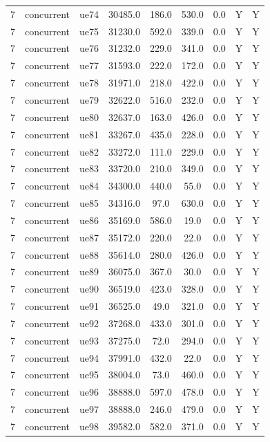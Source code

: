 \begin{table}[ht]
\begin{tabular}{|c|c|c|c|c|c|c|c|c|}
7 & concurrent & ue74 & 30485.0 & 186.0 & 530.0 & 0.0 & Y & Y \\
7 & concurrent & ue75 & 31230.0 & 592.0 & 339.0 & 0.0 & Y & Y \\
7 & concurrent & ue76 & 31232.0 & 229.0 & 341.0 & 0.0 & Y & Y \\
7 & concurrent & ue77 & 31593.0 & 222.0 & 172.0 & 0.0 & Y & Y \\
7 & concurrent & ue78 & 31971.0 & 218.0 & 422.0 & 0.0 & Y & Y \\
7 & concurrent & ue79 & 32622.0 & 516.0 & 232.0 & 0.0 & Y & Y \\
7 & concurrent & ue80 & 32637.0 & 163.0 & 426.0 & 0.0 & Y & Y \\
7 & concurrent & ue81 & 33267.0 & 435.0 & 228.0 & 0.0 & Y & Y \\
7 & concurrent & ue82 & 33272.0 & 111.0 & 229.0 & 0.0 & Y & Y \\
7 & concurrent & ue83 & 33720.0 & 210.0 & 349.0 & 0.0 & Y & Y \\
7 & concurrent & ue84 & 34300.0 & 440.0 & 55.0 & 0.0 & Y & Y \\
7 & concurrent & ue85 & 34316.0 & 97.0 & 630.0 & 0.0 & Y & Y \\
7 & concurrent & ue86 & 35169.0 & 586.0 & 19.0 & 0.0 & Y & Y \\
7 & concurrent & ue87 & 35172.0 & 220.0 & 22.0 & 0.0 & Y & Y \\
7 & concurrent & ue88 & 35614.0 & 280.0 & 426.0 & 0.0 & Y & Y \\
7 & concurrent & ue89 & 36075.0 & 367.0 & 30.0 & 0.0 & Y & Y \\
7 & concurrent & ue90 & 36519.0 & 423.0 & 328.0 & 0.0 & Y & Y \\
7 & concurrent & ue91 & 36525.0 & 49.0 & 321.0 & 0.0 & Y & Y \\
7 & concurrent & ue92 & 37268.0 & 433.0 & 301.0 & 0.0 & Y & Y \\
7 & concurrent & ue93 & 37275.0 & 72.0 & 294.0 & 0.0 & Y & Y \\
7 & concurrent & ue94 & 37991.0 & 432.0 & 22.0 & 0.0 & Y & Y \\
7 & concurrent & ue95 & 38004.0 & 73.0 & 460.0 & 0.0 & Y & Y \\
7 & concurrent & ue96 & 38888.0 & 597.0 & 478.0 & 0.0 & Y & Y \\
7 & concurrent & ue97 & 38888.0 & 246.0 & 479.0 & 0.0 & Y & Y \\
7 & concurrent & ue98 & 39582.0 & 582.0 & 371.0 & 0.0 & Y & Y \\

\end{tabular}
\end{table}
